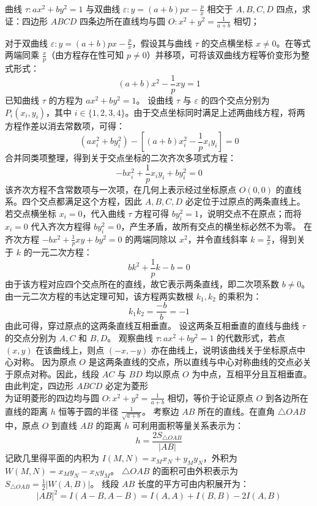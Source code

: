 \begin{example}
曲线 $\tau: ax^2 + by^2 = 1$ 与双曲线 $\varepsilon: y = (a + b)px - \frac{p}{x}$ 相交于 $A,B,C,D$ 四点，求证：四边形 $ABCD$ 四条边所在直线均与圆 $O: x^2 + y^2 = \frac{1}{a + b}$ 相切；
\end{example}
\begin{solution}
对于双曲线 $\varepsilon: y = (a + b)px - \frac{p}{x}$，假设其与曲线 $\tau$ 的交点横坐标 $x \neq 0$。在等式两端同乘 $\frac{x}{p}$（由方程存在性可知 $p \neq 0$）并移项，可将该双曲线方程等价变形为整式形式：
\[ (a+b)x^2 - \frac{1}{p}xy = 1 \]
已知曲线 $\tau$ 的方程为 $ax^2 + by^2 = 1$。
设曲线 $\tau$ 与 $\varepsilon$ 的四个交点分别为 $P_i(x_i, y_i)$，其中 $i \in \{1,2,3,4\}$。由于交点坐标同时满足上述两曲线方程，将两方程作差以消去常数项，可得：
\[ (ax_i^2 + by_i^2) - \left[ (a+b)x_i^2 - \frac{1}{p}x_i y_i \right] = 0 \]
合并同类项整理，得到关于交点坐标的二次齐次多项式方程：
\[ -bx_i^2 + \frac{1}{p}x_i y_i + by_i^2 = 0 \]
该齐次方程不含常数项与一次项，在几何上表示经过坐标原点 $O(0,0)$ 的直线系。四个交点都满足这个方程，因此 $A, B, C, D$ 必定位于过原点的两条直线上。
若交点横坐标 $x_i = 0$，代入曲线 $\tau$ 方程可得 $b y_i^2 = 1$，说明交点不在原点；而将 $x_i = 0$ 代入齐次方程得 $b y_i^2 = 0$，产生矛盾，故所有交点的横坐标必然不为零。
在齐次方程 $-bx^2 + \frac{1}{p}xy + by^2 = 0$ 的两端同除以 $x^2$，并令直线斜率 $k = \frac{y}{x}$，得到关于 $k$ 的一元二次方程：
\[ bk^2 + \frac{1}{p}k - b = 0 \]
由于该方程对应四个交点所在的直线，故它表示两条直线，即二次项系数 $b \neq 0$。由一元二次方程的韦达定理可知，该方程两实数根 $k_1, k_2$ 的乘积为：
\[ k_1 k_2 = \frac{-b}{b} = -1 \]
由此可得，穿过原点的这两条直线互相垂直。
设这两条互相垂直的直线与曲线 $\tau$ 的交点分别为 $A, C$ 和 $B, D$。
观察曲线 $\tau: ax^2 + by^2 = 1$ 的代数形式，若点 $(x, y)$ 在该曲线上，则点 $(-x, -y)$ 亦在曲线上，说明该曲线关于坐标原点中心对称。
因为原点 $O$ 是这两条直线的交点，所以直线与中心对称曲线的交点必关于原点对称。因此，线段 $AC$ 与 $BD$ 均以原点 $O$ 为中点，互相平分且互相垂直。
由此判定，四边形 $ABCD$ 必定为菱形\\
为证明菱形的四边均与圆 $O: x^2 + y^2 = \frac{1}{a+b}$ 相切，等价于论证原点 $O$ 到各边所在直线的距离 $h$ 恒等于圆的半径 $\frac{1}{\sqrt{a+b}}$。
考察边 $AB$ 所在的直线。在直角 $\triangle OAB$ 中，原点 $O$ 到直线 $AB$ 的距离 $h$ 可利用面积等量关系表示为：
\[ h = \frac{2 S_{\triangle OAB}}{|AB|} \]
记欧几里得平面的内积为 $I(M,N) = x_M x_N + y_M y_N$，外积为 $W(M,N) = x_M y_N - x_N y_M$。
$\triangle OAB$ 的面积可由外积表示为 $S_{\triangle OAB} = \frac{1}{2} |W(A,B)|$。
线段 $AB$ 长度的平方可由内积展开为：
\[ |AB|^2 = I(A-B, A-B) = I(A,A) + I(B,B) - 2I(A,B) \]

\end{solution}
